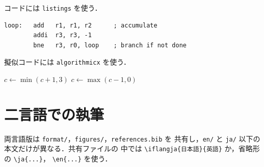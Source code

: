 \documentclass[../main.tex]{subfiles}
\begin{document}
コードには \verb|listings| を使う．
\begin{lstlisting}[language={[x86masm]Assembler}, caption={アセンブリのループ．}]
loop:   add   r1, r1, r2      ; accumulate
        addi  r3, r3, -1
        bne   r3, r0, loop    ; branch if not done
\end{lstlisting}

擬似コードには \verb|algorithmicx| を使う．
\begin{algorithm}[htbp]
  \caption{2ビット飽和カウンタの更新}
  \begin{algorithmic}[1]
      \State $c \gets \min(c+1, 3)$
    \Else
      \State $c \gets \max(c-1, 0)$
    \EndIf
  \end{algorithmic}
\end{algorithm}

\section{二言語での執筆}

両言語版は \texttt{format/}，\texttt{figures/}，\texttt{references.bib} を
共有し，\texttt{en/} と \texttt{ja/} 以下の本文だけが異なる．共有ファイルの
中では \verb|\iflangja{日本語}{英語}| か，省略形の \verb|\ja{...}|，
\verb|\en{...}| を使う．
\end{document}
